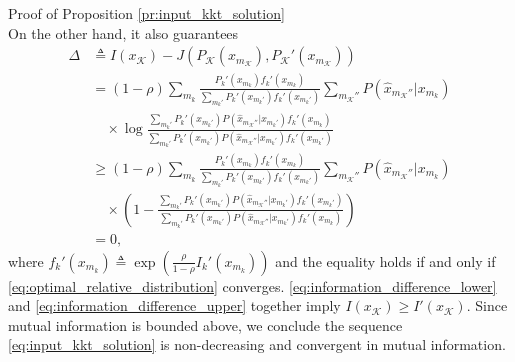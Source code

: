 \documentclass[journal]{IEEEtran}
\begin{document}
\begin{appendix}
\begin{subsection}{Proof of Proposition \ref{pr:input_kkt_solution}}
\begin{equation}
			\label{eq:information_difference_lower}
		\end{equation}
		On the other hand, it also guarantees
		\begin{subequations}
			\label{eq:information_difference_upper}
			\begin{align}
				\Delta
				 & \triangleq I(x_{\mathcal{K}}) - J \left( P_{\mathcal{K}}(x_{m_{\mathcal{K}}}),P_{\mathcal{K}}'(x_{m_{\mathcal{K}}}) \right)                                                                                \\
				 & = (1 - \rho) \sum_{m_k} \frac{P_k'(x_{m_k}) f_k'(x_{m_k})}{\sum_{m_k'} P_k'(x_{m_k'}) f_k'(x_{m_k'})} \sum_{m_{\mathcal{K}}''} P(\hat{x}_{m_{\mathcal{K}}''}|x_{m_k})\nonumber                             \\
				 & \quad \times \log \frac{\sum_{m_k'} P_k'(x_{m_k'}) P(\hat{x}_{m_{\mathcal{K}}''}|x_{m_k'}) f_k'(x_{m_k})}{\sum_{m_k'} P_k'(x_{m_k'}) P(\hat{x}_{m_{\mathcal{K}}''}|x_{m_k'}) f_k'(x_{m_k'})}               \\
				 & \ge (1 - \rho) \sum_{m_k} \frac{P_k'(x_{m_k}) f_k'(x_{m_k})}{\sum_{m_k'} P_k'(x_{m_k'}) f_k'(x_{m_k'})} \sum_{m_{\mathcal{K}}''} P(\hat{x}_{m_{\mathcal{K}}''}|x_{m_k})\nonumber                           \\
				 & \quad \times \left( 1 - \frac{\sum_{m_k'} P_k'(x_{m_k'}) P(\hat{x}_{m_{\mathcal{K}}''}|x_{m_k'}) f_k'(x_{m_k'})}{\sum_{m_k'} P_k'(x_{m_k'}) P(\hat{x}_{m_{\mathcal{K}}''}|x_{m_k'}) f_k'(x_{m_k})} \right) \\
				 & = 0,
			\end{align}
		\end{subequations}
		where $f_k'(x_{m_k}) \triangleq \exp \left( \frac{\rho}{1 - \rho} I_k'(x_{m_k}) \right)$ and the equality holds if and only if \eqref{eq:optimal_relative_distribution} converges.
		\eqref{eq:information_difference_lower} and \eqref{eq:information_difference_upper} together imply $I(x_{\mathcal{K}}) \ge I'(x_{\mathcal{K}})$.
		Since mutual information is bounded above, we conclude the sequence \eqref{eq:input_kkt_solution} is non-decreasing and convergent in mutual information.


\end{subsection}
\end{appendix}
\end{document}
